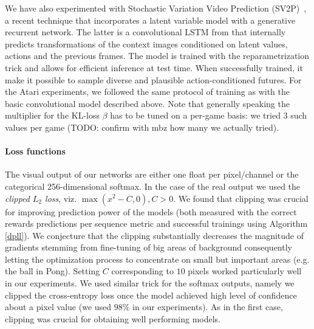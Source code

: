 We have also experimented with Stochastic Variation Video Prediction (SV2P)~\cite{sv2p}, a recent technique that incorporates a latent variable model with a generative recurrent network. The latter is a convolutional LSTM from \cite{cdna} that internally predicts transformations of the context images conditioned on latent values, actions and the previous frames. The model is trained with the reparametrization trick and allows for efficient inference at test time. When successfully trained, it make it possible to sample diverse and plausible action-conditioned futures. For the Atari experiments, we followed the same protocol of training as with the basic convolutional model described above. Note that generally speaking the multiplier for the KL-loss $\beta$ has to be tuned on a per-game basis: we tried 3 such values per game (TODO: confirm with mbz how many we actually tried).


\paragraph{Loss functions}
The visual output of our networks are either one float per pixel/channel or the categorical 256-dimensional softmax. 
In the case of the real output we used the \textit{clipped $L_2$ loss}, viz. $\max(x^2 - C, 0), C>0$. We found that clipping was crucial for improving prediction power of the models (both measured with the correct rewards predictions per sequence metric and successful trainings using Algorithm \ref{dpll}). We conjecture that the clipping substantially decreases the magnitude of gradients stemming from fine-tuning of big areas of background consequently letting the optimization process to concentrate on small but important areas (e.g. the ball in Pong). Setting $C$ corresponding to $10$ pixels worked particularly well in our experiments. 
We used similar trick for the softmax outputs, namely we clipped the cross-entropy loss once the model achieved high level of confidence about a pixel value (we used $98\%$ in our experiments). As in the first case, clipping was crucial for obtaining well performing models. 

